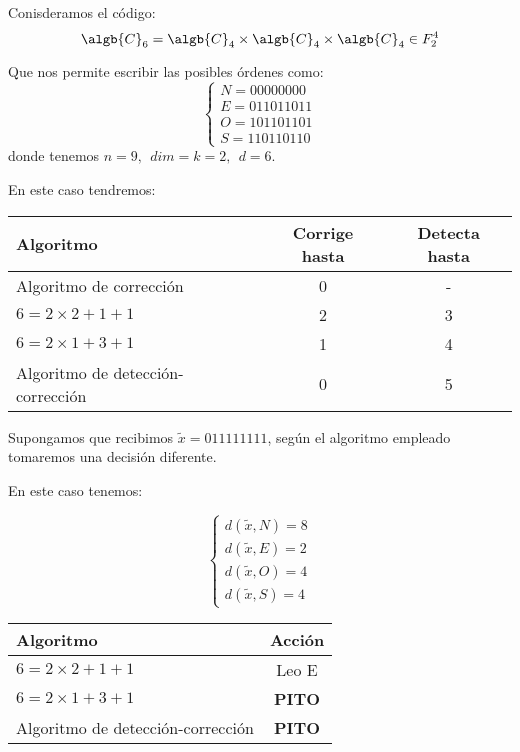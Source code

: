 \begin{example}
Conisderamos el código:
\[\algb{C}_6=\algb{C}_4 \times \algb{C}_4 \times \algb{C}_4 \in F_2^4\]

Que nos permite escribir las posibles órdenes como:
\[\left\{ \begin{array}{l}
N = 00000000 \\ E = 011011011 \\ O = 101101101 \\ S = 110110110
\end{array}\right.\]
donde tenemos $n=9,\ \ dim=k=2, \ \ d=6$.

En este caso tendremos:
\begin{center}
\begin{tabular}{|l|c|c|}
\hline
Algoritmo & Corrige hasta & Detecta hasta \\
\hline
\hline
Algoritmo de corrección & 0 & -\\
\hline
$6 = 2 \times 2 + 1 + 1$ & 2 & 3 \\
\hline
$6=2\times 1 + 3 + 1 $ & 1 & 4 \\
\hline
Algoritmo de detección-corrección & 0 & 5 \\
\hline
\end{tabular}
\end{center}

Supongamos que recibimos $\tilde{x}=011111111$, según el algoritmo empleado tomaremos una decisión diferente.

En este caso tenemos:

\begin{minipage}{0.3\textwidth}
\[\left\{ \begin{array}{l}
d(\tilde{x},N) = 8 \\
d(\tilde{x},E) = 2 \\
d(\tilde{x},O) = 4 \\
d(\tilde{x},S) = 4
\end{array}\right.\]
\end{minipage}
\begin{minipage}{0.65\textwidth}
\begin{center}
\begin{tabular}{|l|c|}
\hline
Algoritmo & Acción \\
\hline
\hline
$6 = 2 \times 2 + 1 + 1$ & Leo E \\
\hline
$6=2\times 1 + 3 + 1 $ & \textbf{PITO} \\
\hline
Algoritmo de detección-corrección & \textbf{PITO}\\
\hline
\end{tabular}
\end{center}
\end{minipage}
\end{example}


